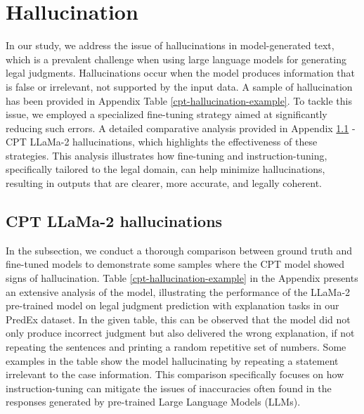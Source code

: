 \section{Hallucination}
\label{sec:hallucination}
In our study, we address the issue of hallucinations in model-generated text, which is a prevalent challenge when using large language models for generating legal judgments. Hallucinations occur when the model produces information that is false or irrelevant, not supported by the input data. A sample of hallucination has been provided in Appendix Table \ref{cpt-hallucination-example}. To tackle this issue, we employed a specialized fine-tuning strategy aimed at significantly reducing such errors. A detailed comparative analysis provided in Appendix \ref{subsec:CPT-hallucination} 
 - CPT LLaMa-2 hallucinations, which 
 highlights the effectiveness of these strategies. This analysis illustrates how fine-tuning and instruction-tuning, specifically tailored to the legal domain, can help minimize hallucinations, resulting in outputs that are clearer, more accurate, and legally coherent.


\subsection{CPT LLaMa-2 hallucinations}
\label{subsec:CPT-hallucination}
In the subsection, we conduct a thorough comparison between ground truth and fine-tuned models to demonstrate some samples where the CPT model showed signs of hallucination. Table \ref{cpt-hallucination-example} in the Appendix presents an extensive analysis of the model, illustrating the performance of the LLaMa-2 pre-trained model on legal judgment prediction with explanation tasks in our PredEx dataset. In the given table, this can be observed that the model did not only produce incorrect judgment but also delivered the wrong explanation, if not repeating the sentences and printing a random repetitive set of numbers. Some examples in the table show the model hallucinating by repeating a statement irrelevant to the case information. This comparison specifically focuses on how instruction-tuning can mitigate the issues of inaccuracies often found in the responses generated by pre-trained Large Language Models (LLMs).

